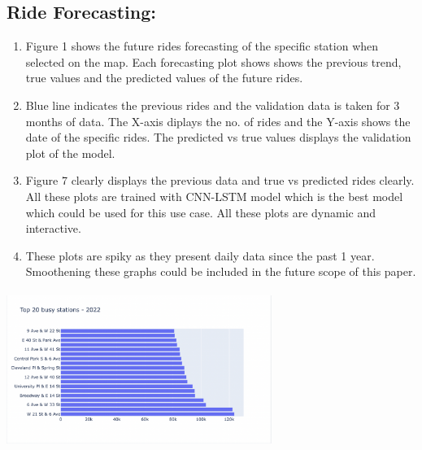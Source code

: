 \documentclass[journal]{vgtc}                     %
\begin{document}
\subsection{Ride Forecasting:}
\begin{enumerate}
    \item Figure 1 shows the future rides forecasting of the specific station when selected on the map. Each forecasting plot shows shows the previous trend, true values and the predicted values of the future rides. 
    \item Blue line indicates the previous rides and the validation data is taken for 3 months of data. The X-axis diplays the no. of rides and the Y-axis shows the date of the specific rides. The predicted vs true values displays the validation plot of the model. 
    \item Figure 7 clearly displays the previous data and true vs predicted rides clearly. All these plots are trained with CNN-LSTM model which is the best model which could be used for this use case. All these plots are dynamic and interactive.
    \item These plots are spiky as they present daily data since the past 1 year. Smoothening these graphs could be included in the future scope of this paper.
\end{enumerate}
\parbox{\linewidth}{
        \includegraphics[width=3.4in, height=2in]{figs/busy.png}\\
        }
\end{document}
